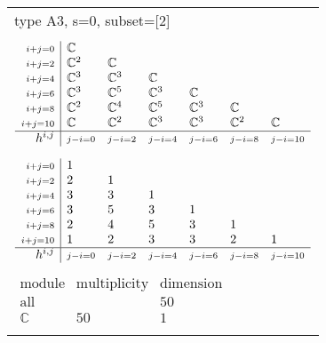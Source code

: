 \documentclass[crop,border=2mm]{standalone}
\begin{document}
\begin{tabular}{l}
{\huge type A3, s=0, subset=[2]}\\ \\


$\displaystyle
\begin{array}{r|l l l l l l}
	{\scriptstyle i+j=0}&\mathbb{C}&&&&&\\
	{\scriptstyle i+j=2}&\mathbb{C}^{2}&\mathbb{C}&&&&\\
	{\scriptstyle i+j=4}&\mathbb{C}^{3}&\mathbb{C}^{3}&\mathbb{C}&&&\\
	{\scriptstyle i+j=6}&\mathbb{C}^{3}&\mathbb{C}^{5}&\mathbb{C}^{3}&\mathbb{C}&&\\
	{\scriptstyle i+j=8}&\mathbb{C}^{2}&\mathbb{C}^{4}&\mathbb{C}^{5}&\mathbb{C}^{3}&\mathbb{C}&\\
	{\scriptstyle i+j=10}&\mathbb{C}&\mathbb{C}^{2}&\mathbb{C}^{3}&\mathbb{C}^{3}&\mathbb{C}^{2}&\mathbb{C}\\
	\hline h^{i,j}&{\scriptstyle j-i=0}&{\scriptstyle j-i=2}&{\scriptstyle j-i=4}&{\scriptstyle j-i=6}&{\scriptstyle j-i=8}&{\scriptstyle j-i=10}
\end{array}
$ \\ \\


$\displaystyle
\begin{array}{r|l l l l l l}
	{\scriptstyle i+j=0}&1&&&&&\\
	{\scriptstyle i+j=2}&2&1&&&&\\
	{\scriptstyle i+j=4}&3&3&1&&&\\
	{\scriptstyle i+j=6}&3&5&3&1&&\\
	{\scriptstyle i+j=8}&2&4&5&3&1&\\
	{\scriptstyle i+j=10}&1&2&3&3&2&1\\
	\hline h^{i,j}&{\scriptstyle j-i=0}&{\scriptstyle j-i=2}&{\scriptstyle j-i=4}&{\scriptstyle j-i=6}&{\scriptstyle j-i=8}&{\scriptstyle j-i=10}
\end{array}
$ \\ \\


$\displaystyle
\begin{array}{rll}
	\text{module}&\text{multiplicity}&\text{dimension} \\ \hline \text{all}&&50 \\
	\mathbb{C}&50&1
\end{array}
$ \\ \\

\end{tabular}
\end{document}
